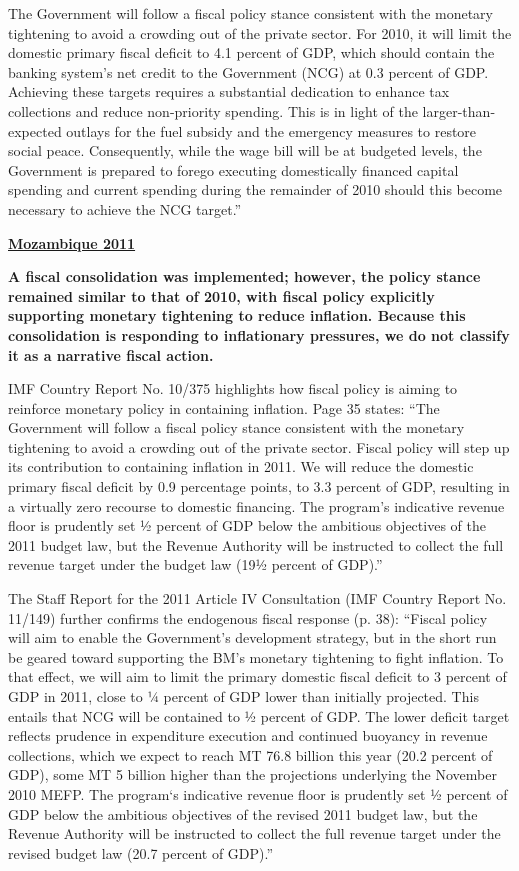 The Government will follow a fiscal policy stance consistent with the monetary tightening to avoid a crowding out of the private sector. For 2010, it will limit the domestic primary fiscal deficit to 4.1 percent of GDP, which should contain the banking system’s net credit to the Government (NCG) at 0.3 percent of GDP. Achieving these targets requires a substantial dedication to enhance tax collections and reduce non-priority spending. This is in light of the larger-than-expected outlays for the fuel subsidy and the emergency measures to restore social peace. Consequently, while the wage bill will be at budgeted levels, the Government is prepared to forego executing domestically financed capital spending and current spending during the remainder of 2010 should this become necessary to achieve the NCG target.”

\textbf{\underline{Mozambique 2011}}

\textbf{A fiscal consolidation was implemented; however, the policy stance remained similar to that of 2010, with fiscal policy explicitly supporting monetary tightening to reduce inflation. Because this consolidation is responding to inflationary pressures, we do not classify it as a narrative fiscal action.}

IMF Country Report No. 10/375 highlights how fiscal policy is aiming to reinforce monetary policy in containing inflation. Page 35 states: “The Government will follow a fiscal policy stance consistent with the monetary tightening to avoid a crowding out of the private sector. Fiscal policy will step up its contribution to containing inflation in 2011. We will reduce the domestic primary fiscal deficit by 0.9 percentage points, to 3.3 percent of GDP, resulting in a virtually zero recourse to domestic financing. The program’s indicative revenue floor is prudently set ½ percent of GDP below the ambitious objectives of the 2011 budget law, but the Revenue Authority will be instructed to collect the full revenue target under the budget law (19½ percent of GDP).”

The Staff Report for the 2011 Article IV Consultation (IMF Country Report No. 11/149) further confirms the endogenous fiscal response (p. 38): “Fiscal policy will aim to enable the Government’s development strategy, but in the short run be geared toward supporting the BM’s monetary tightening to fight inflation. To that effect, we will aim to limit the primary domestic fiscal deficit to 3 percent of GDP in 2011, close to ¼ percent of GDP lower than initially projected. This entails that NCG will be contained to ½ percent of GDP. The lower deficit target reflects prudence in expenditure execution and continued buoyancy in revenue collections, which we expect to reach MT 76.8 billion this year (20.2 percent of GDP), some MT 5 billion higher than the projections underlying the November 2010 MEFP. The program‘s indicative revenue floor is prudently set ½ percent of GDP below the ambitious objectives of the revised 2011 budget law, but the Revenue Authority will be instructed to collect the full revenue target under the revised budget law (20.7 percent of GDP).”

